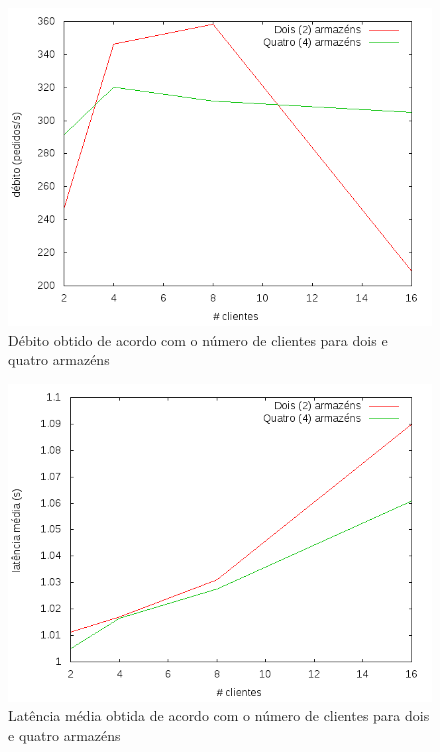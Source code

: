\begin{figure}[!h]
\centering
\includegraphics[scale=.5]{img/questao-1/read-com-deb}
\caption{Débito obtido de acordo com o número de clientes para dois e quatro armazéns}
\end{figure}

\begin{figure}[!h]
\centering
\includegraphics[scale=.5]{img/questao-1/read-com-lat-med}
\caption{Latência média obtida de acordo com o número de clientes para dois e quatro armazéns}
\end{figure}

